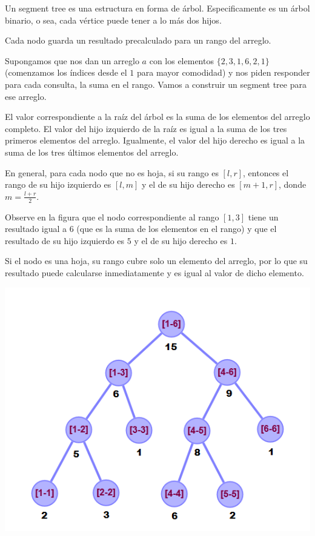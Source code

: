 Un segment tree es una estructura en forma de \'arbol. Especificamente es un \'arbol binario, o sea, cada v\'ertice puede tener a lo m\'as dos hijos.

Cada nodo guarda un resultado precalculado para un rango del arreglo.  

Supongamos que nos dan un arreglo $a$ con los elementos $\{2, 3, 1, 6, 2, 1\}$ (comenzamos los \'indices desde el $1$ para mayor comodidad) y nos piden responder para cada consulta, la suma en el rango. Vamos a construir un segment tree para ese arreglo.

El valor correspondiente a la ra\'iz del \'arbol es la suma de los elementos del arreglo completo. El valor del hijo izquierdo de la ra\'iz es igual a la suma de los tres primeros elementos del arreglo. Igualmente, el valor del hijo derecho es igual a la suma de los tres \'ultimos elementos del arreglo.

En general, para cada nodo que no es hoja, si su rango es $[l, r]$, entonces el rango de su hijo izquierdo es $[l, m]$ y el de su hijo derecho es $[m+1, r]$, donde $m = \frac{l+r}{2}$.

Observe en la figura que el nodo correspondiente al rango $[1, 3]$ tiene un resultado igual a $6$ (que es la suma de los elementos en el rango) y que el resultado de su hijo izquierdo es $5$ y el de su hijo derecho es $1$.

Si el nodo es una hoja, su rango cubre solo un elemento del arreglo, por lo que su resultado puede calcularse inmediatamente y es igual al valor de dicho elemento.

\begin{minipage}{\columnwidth}
    \includegraphics[width=\linewidth]{imag/segment_tree_suma.png}
    \label{example_sum}
\end{minipage}

